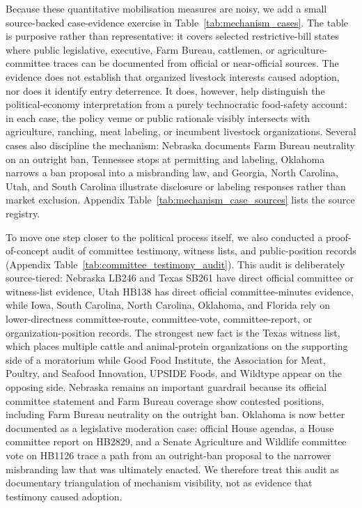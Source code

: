 \documentclass[12pt]{article}
\begin{document}
Because these quantitative mobilisation measures are noisy, we add a small source-backed case-evidence exercise in Table~\ref{tab:mechanism_cases}.  The table is purposive rather than representative: it covers selected restrictive-bill states where public legislative, executive, Farm Bureau, cattlemen, or agriculture-committee traces can be documented from official or near-official sources.  The evidence does not establish that organized livestock interests caused adoption, nor does it identify entry deterrence.  It does, however, help distinguish the political-economy interpretation from a purely technocratic food-safety account: in each case, the policy venue or public rationale visibly intersects with agriculture, ranching, meat labeling, or incumbent livestock organizations.  Several cases also discipline the mechanism: Nebraska documents Farm Bureau neutrality on an outright ban, Tennessee stops at permitting and labeling, Oklahoma narrows a ban proposal into a misbranding law, and Georgia, North Carolina, Utah, and South Carolina illustrate disclosure or labeling responses rather than market exclusion.  Appendix Table~\ref{tab:mechanism_case_sources} lists the source registry.

To move one step closer to the political process itself, we also conducted a proof-of-concept audit of committee testimony, witness lists, and public-position records (Appendix Table~\ref{tab:committee_testimony_audit}).  This audit is deliberately source-tiered: Nebraska LB246 and Texas SB261 have direct official committee or witness-list evidence, Utah HB138 has direct official committee-minutes evidence, while Iowa, South Carolina, North Carolina, Oklahoma, and Florida rely on lower-directness committee-route, committee-vote, committee-report, or organization-position records.  The strongest new fact is the Texas witness list, which places multiple cattle and animal-protein organizations on the supporting side of a moratorium while Good Food Institute, the Association for Meat, Poultry, and Seafood Innovation, UPSIDE Foods, and Wildtype appear on the opposing side.  Nebraska remains an important guardrail because its official committee statement and Farm Bureau coverage show contested positions, including Farm Bureau neutrality on the outright ban.  Oklahoma is now better documented as a legislative moderation case: official House agendas, a House committee report on HB2829, and a Senate Agriculture and Wildlife committee vote on HB1126 trace a path from an outright-ban proposal to the narrower misbranding law that was ultimately enacted.  We therefore treat this audit as documentary triangulation of mechanism visibility, not as evidence that testimony caused adoption.
\end{document}
